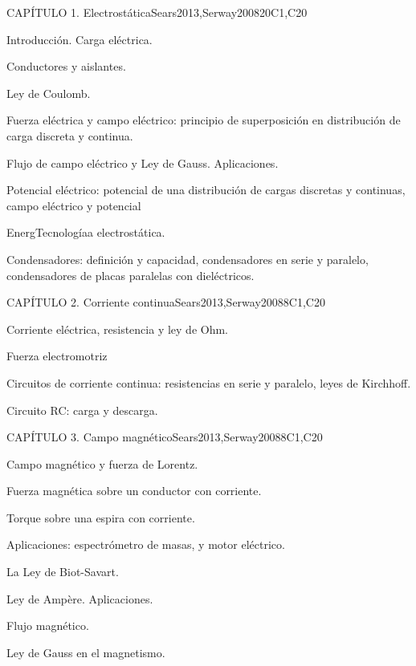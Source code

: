 \begin{syllabus}
\begin{unit}{CAPÍTULO 1. Electrostática}{}{Sears2013,Serway2008}{20}{C1,C20}
\begin{topics}
      \item Introducción. Carga eléctrica.
      \item Conductores y aislantes.
      \item Ley de Coulomb.
      \item Fuerza eléctrica y campo eléctrico: principio de superposición en distribución de carga discreta y continua.
      \item Flujo de campo eléctrico y Ley de Gauss. Aplicaciones.
      \item Potencial eléctrico: potencial de una distribución de cargas discretas y continuas, campo eléctrico y potencial
      \item EnergTecnologíaa electrostática.
      \item Condensadores: definición y capacidad, condensadores en serie y paralelo, condensadores de placas paralelas con dieléctricos.
   \end{topics}

\end{unit}

\begin{unit}{CAPÍTULO 2. Corriente continua}{}{Sears2013,Serway2008}{8}{C1,C20}
\begin{topics}
      \item Corriente eléctrica, resistencia y ley de Ohm.
      \item Fuerza electromotriz
      \item Circuitos de corriente continua: resistencias en serie y paralelo, leyes de Kirchhoff. 
      \item Circuito RC: carga y descarga.
    \end{topics}

\end{unit}

\begin{unit}{CAPÍTULO 3. Campo magnético}{}{Sears2013,Serway2008}{8}{C1,C20}
\begin{topics}
      \item Campo magnético y fuerza de Lorentz.
      \item Fuerza magnética sobre un conductor con corriente.
      \item Torque sobre una espira con corriente.
      \item Aplicaciones: espectrómetro de masas, y motor eléctrico.
      \item La Ley de Biot-Savart. 
      \item Ley de Ampère. Aplicaciones.
      \item Flujo magnético.
      \item Ley de Gauss en el magnetismo.
\end{topics}


\end{unit}
\end{syllabus}
